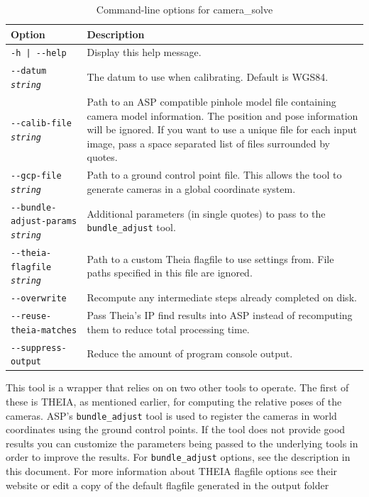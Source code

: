 \begin{longtable}{|l|p{7.5cm}|}
\caption{Command-line options for camera\_solve}
\label{tbl:camerasolve}
\endfirsthead
\endhead
\endfoot
\endlastfoot
\hline
Option & Description \\ \hline \hline
\texttt{-h | -\/-help } & Display this help message.\\ \hline
\texttt{-\/-datum  \textit{string}} & The datum to use when calibrating.  Default is WGS84.\\ \hline
\texttt{-\/-calib-file  \textit{string}} & Path to an ASP compatible pinhole model file containing 
camera model information. The position and pose information will be ignored. If you want 
to use a unique file for each input image, pass a space separated list of files surrounded by quotes.\\ \hline
\texttt{-\/-gcp-file  \textit{string}} & Path to a ground control point file.  This allows
the tool to generate cameras in a global coordinate system.\\ \hline
\texttt{-\/-bundle-adjust-params  \textit{string}} & Additional parameters (in single quotes)
to pass to the \texttt{bundle\_adjust} tool.\\ \hline
\texttt{-\/-theia-flagfile  \textit{string}} & Path to a custom Theia flagfile to use settings from.
File paths specified in this file are ignored.\\ \hline
\texttt{-\/-overwrite}  & Recompute any intermediate steps already completed on disk.\\ \hline
\texttt{-\/-reuse-theia-matches}  & Pass Theia's IP find results into ASP instead of recomputing 
them to reduce total processing time.\\ \hline
\texttt{-\/-suppress-output} & Reduce the amount of program console output.\\ \hline
\end{longtable}

This tool is a wrapper that relies on on two other tools to operate.
The first of these is THEIA, as mentioned earlier, for computing the
relative poses of the cameras.  ASP's \texttt{bundle\_adjust} tool is
used to register the cameras in world coordinates using the ground
control points.  If the tool does not provide good results you can
customize the parameters being passed to the underlying tools in order
to improve the results.  For \texttt{bundle\_adjust} options, see the
description in this document.  For more information about THEIA flagfile
options see their website or edit a copy of the default flagfile
generated in the output folder



